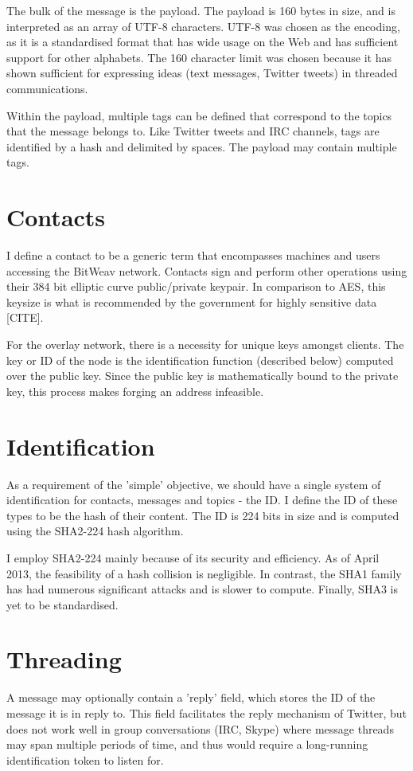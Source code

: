 \documentclass[10pt,a4paper,onecolumn]{article}
\begin{document}
The bulk of the message is the payload. The payload is 160 bytes in size, and is interpreted as an array of UTF-8 characters. UTF-8 was chosen as the encoding, as it is a standardised format that has wide usage on the Web and has sufficient support for other alphabets. The 160 character limit was chosen because it has shown sufficient for expressing ideas (text messages, Twitter tweets) in threaded communications. 

Within the payload, multiple tags can be defined that correspond to the topics that the message belongs to. Like Twitter tweets and IRC channels, tags are identified by a hash and delimited by spaces. The payload may contain multiple tags.


\section{Contacts}
I define a contact to be a generic term that encompasses machines and users accessing the BitWeav network. Contacts sign and perform other operations using their 384 bit elliptic curve public/private keypair. In comparison to AES, this keysize is what is recommended by the government for highly sensitive data [CITE].

For the overlay network, there is a necessity for unique keys amongst clients. The key or ID of the node is the identification function (described below) computed over the public key. Since the public key is mathematically bound to the private key, this process makes forging an address infeasible.


\section{Identification}
As a requirement of the 'simple' objective, we should have a single system of identification for contacts, messages and topics - the ID. I define the ID of these types to be the hash of their content. The ID is 224 bits in size and is computed using the SHA2-224 hash algorithm.

I employ SHA2-224 mainly because of its security and efficiency. As of April 2013, the feasibility of a hash collision is negligible. In contrast, the SHA1 family has had numerous significant attacks and is slower to compute. Finally, SHA3 is yet to be standardised. 


\section{Threading}
A message may optionally contain a 'reply' field, which stores the ID of the message it is in reply to. This field facilitates the reply mechanism of Twitter, but does not work well in group conversations (IRC, Skype) where message threads may span multiple periods of time, and thus would require a long-running identification token to listen for.
\end{document}
